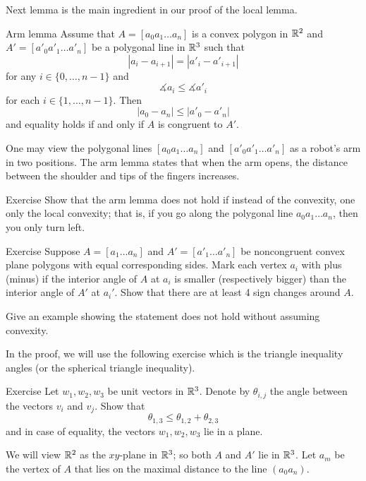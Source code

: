 Next lemma is the main ingredient in our proof of the local lemma.

\begin{thm}{Arm lemma}\label{lem:arm}
Assume that $A=[a_0 a_1\dots a_n]$ is a convex polygon in $\mathbb{R}^2$
and $A'=[a'_0 a'_1\dots a'_n]$ be a polygonal line in $\mathbb{R}^3$
such that 
$$|a_i-a_{i+1}|=|a'_i-a'_{i+1}|$$ for any $i\in\{0,\dots,n-1\}$
and 
$$\measuredangle a_i\le \measuredangle a'_i$$ 
for each $i\in\{1,\dots,n-1\}$.
Then 
$$|a_0-a_n|\le |a'_0-a'_n|$$
and equality holds if and only if $A$ is congruent to $A'$.
\end{thm}

One may view the polygonal lines $[a_0a_1\dots a_n]$ and $[a'_0a'_1\dots a'_n]$ as a robot's arm in two positions.
The arm lemma states that when the arm opens, 
the distance between the shoulder and tips of the fingers increases. 

\begin{thm}{Exercise}
Show that the arm lemma does not hold if 
instead of the convexity,
one only the local convexity;
that is, if you go along the polygonal line $a_0 a_1\dots a_n$, then you only turn left.
\end{thm}

\begin{thm}{Exercise}\label{ex:cauchy}
Suppose $A=[a_1\dots a_n]$ and $A'=[a'_1\dots a'_n]$ be noncongruent convex plane polygons with equal corresponding sides.
Mark each vertex $a_i$ with plus (minus) if the interior angle of $A$ at $a_i$ is smaller (respectively bigger) than the interior angle of $A'$ at $a_i'$.
Show that there are at least 4 sign changes around $A$. %

Give an example showing the statement does not hold without assuming convexity.

\end{thm}


In the proof, we will use the following exercise which is the triangle inequality angles (or the spherical triangle inequality). 

\begin{thm}{Exercise}\label{ex:angle-triangle}
Let $w_1,w_2,w_3$ be unit vectors in $\mathbb{R}^3$.
Denote by $\theta_{i,j}$ the angle between the vectors $v_i$ and $v_j$.
Show that
$$\theta_{1,3}\le \theta_{1,2}+\theta_{2,3}$$
and in case of equality, the vectors $w_1,w_2,w_3$ lie in a plane.
\end{thm}




We will view $\mathbb{R}^2$ as the $xy$-plane in $\mathbb{R}^3$; 
so both $A$ and $A'$ lie in $\mathbb{R}^3$.
Let $a_m$ be the vertex of $A$ that lies on the maximal distance to the line $(a_0a_n)$.

